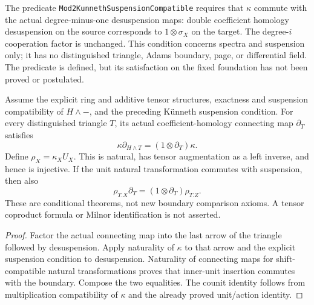\begin{definition}
  \label{def:h6-kunneth-suspension-input}
  \leanok
  The predicate \texttt{Mod2KunnethSuspensionCompatible} requires that
  $\kappa$ commute with the actual degree-minus-one desuspension maps:
  double coefficient homology desuspension on the source corresponds to
  $1\otimes\sigma_X$ on the target. The degree-$i$ cooperation factor is
  unchanged. This condition concerns spectra and suspension only; it has
  no distinguished triangle, Adams boundary, page, or differential field.
  The predicate is defined, but its satisfaction on the fixed foundation
  has not been proved or postulated.
\end{definition}

\begin{proposition}
  \label{prop:h6-kunneth-coaction-boundary}
  \leanok
  Assume the explicit ring and additive tensor structures, exactness and
  suspension compatibility of $H\wedge-$, and the preceding K\"unneth
  suspension condition. For every distinguished triangle $T$, its actual
  coefficient-homology connecting map $\partial_T$ satisfies
  \[
    \kappa\partial_{H\wedge T}
       =(1\otimes\partial_T)\kappa.
  \]
  Define $\rho_X=\kappa_X U_X$. This is natural, has tensor augmentation
  as a left inverse, and hence is injective. If the unit natural
  transformation commutes with suspension, then also
  \[
    \rho_{T.X}\partial_T=(1\otimes\partial_T)\rho_{T.Z}.
  \]
  These are conditional theorems, not new boundary comparison axioms.
  A tensor coproduct formula or Milnor identification is not asserted.
\end{proposition}
\begin{proof}
  Factor the actual connecting map into the last arrow of the triangle
  followed by desuspension. Apply naturality of $\kappa$ to that arrow
  and the explicit suspension condition to desuspension. Naturality of
  connecting maps for shift-compatible natural transformations proves
  that inner-unit insertion commutes with the boundary. Compose the two
  equalities. The counit identity follows from multiplication compatibility
  of $\kappa$ and the already proved unit/action identity.
  \leanok
\end{proof}

